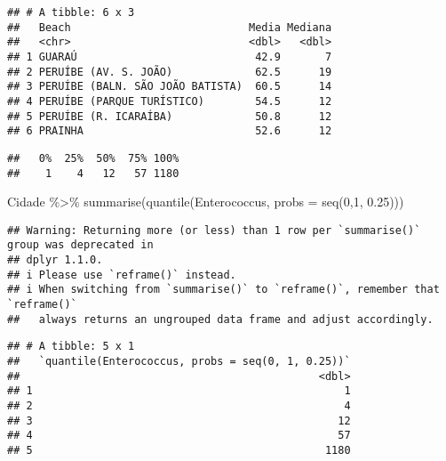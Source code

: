\documentclass[
]{article}
\newenvironment{Shaded}{\begin{snugshade}}{\end{snugshade}}
\newcommand{\AttributeTok}[1]{\textcolor[rgb]{0.77,0.63,0.00}{#1}}
\newcommand{\CommentTok}[1]{\textcolor[rgb]{0.56,0.35,0.01}{\textit{#1}}}
\newcommand{\DecValTok}[1]{\textcolor[rgb]{0.00,0.00,0.81}{#1}}
\newcommand{\FloatTok}[1]{\textcolor[rgb]{0.00,0.00,0.81}{#1}}
\newcommand{\FunctionTok}[1]{\textcolor[rgb]{0.00,0.00,0.00}{#1}}
\newcommand{\NormalTok}[1]{#1}
\newcommand{\SpecialCharTok}[1]{\textcolor[rgb]{0.00,0.00,0.00}{#1}}
\begin{document}
\begin{verbatim}
## # A tibble: 6 x 3
##   Beach                            Media Mediana
##   <chr>                            <dbl>   <dbl>
## 1 GUARAÚ                            42.9       7
## 2 PERUÍBE (AV. S. JOÃO)             62.5      19
## 3 PERUÍBE (BALN. SÃO JOÃO BATISTA)  60.5      14
## 4 PERUÍBE (PARQUE TURÍSTICO)        54.5      12
## 5 PERUÍBE (R. ICARAÍBA)             50.8      12
## 6 PRAINHA                           52.6      12
\end{verbatim}

\begin{Shaded}
\end{Shaded}

\begin{verbatim}
##   0%  25%  50%  75% 100% 
##    1    4   12   57 1180
\end{verbatim}

\begin{Shaded}
\begin{Highlighting}[]
\NormalTok{Cidade }\SpecialCharTok{\%\textgreater{}\%} \FunctionTok{summarise}\NormalTok{(}\FunctionTok{quantile}\NormalTok{(Enterococcus, }\AttributeTok{probs =} \FunctionTok{seq}\NormalTok{(}\DecValTok{0}\NormalTok{,}\DecValTok{1}\NormalTok{, }\FloatTok{0.25}\NormalTok{)))}
\end{Highlighting}
\end{Shaded}

\begin{verbatim}
## Warning: Returning more (or less) than 1 row per `summarise()` group was deprecated in
## dplyr 1.1.0.
## i Please use `reframe()` instead.
## i When switching from `summarise()` to `reframe()`, remember that `reframe()`
##   always returns an ungrouped data frame and adjust accordingly.
\end{verbatim}

\begin{verbatim}
## # A tibble: 5 x 1
##   `quantile(Enterococcus, probs = seq(0, 1, 0.25))`
##                                               <dbl>
## 1                                                 1
## 2                                                 4
## 3                                                12
## 4                                                57
## 5                                              1180
\end{verbatim}
\end{document}
